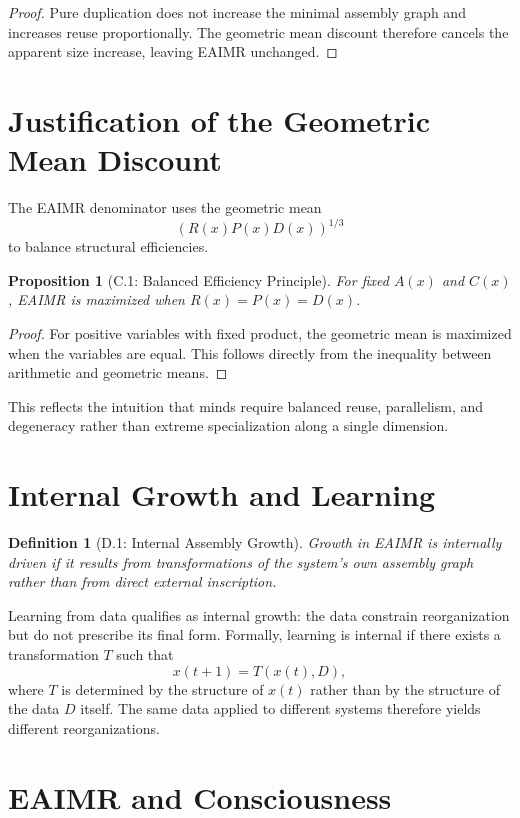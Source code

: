 \documentclass[11pt,letterpaper]{article}
\newtheorem{definition}{Definition}
\newtheorem{proposition}{Proposition}
\begin{document}
\begin{proof}
Pure duplication does not increase the minimal assembly graph and increases reuse proportionally. The geometric mean discount therefore cancels the apparent size increase, leaving EAIMR unchanged.
\end{proof}

\section{Justification of the Geometric Mean Discount}

The EAIMR denominator uses the geometric mean
\[
\left(R(x)P(x)D(x)\right)^{1/3}
\]
to balance structural efficiencies.

\begin{proposition}[C.1: Balanced Efficiency Principle]
For fixed $A(x)$ and $C(x)$, EAIMR is maximized when $R(x)=P(x)=D(x)$.
\end{proposition}

\begin{proof}
For positive variables with fixed product, the geometric mean is maximized when the variables are equal. This follows directly from the inequality between arithmetic and geometric means.
\end{proof}

This reflects the intuition that minds require balanced reuse, parallelism, and degeneracy rather than extreme specialization along a single dimension.

\section{Internal Growth and Learning}

\begin{definition}[D.1: Internal Assembly Growth]
Growth in EAIMR is internally driven if it results from transformations of the system’s own assembly graph rather than from direct external inscription.
\end{definition}

Learning from data qualifies as internal growth: the data constrain reorganization but do not prescribe its final form. Formally, learning is internal if there exists a transformation $T$ such that
\[
x(t+1) = T(x(t),D),
\]
where $T$ is determined by the structure of $x(t)$ rather than by the structure of the data $D$ itself. The same data applied to different systems therefore yields different reorganizations.

\section{EAIMR and Consciousness}
\end{document}
